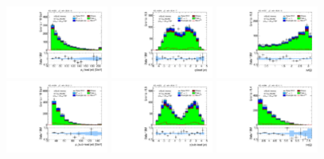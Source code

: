 \clearpage

\begin{figure}[!htpb]
  \includegraphics[width=0.30\textwidth]{figures/analysis/vbf-WlvCR/jet-1-pt}
  \includegraphics[width=0.30\textwidth]{figures/analysis/vbf-WlvCR/jet-1-eta}
  \includegraphics[width=0.30\textwidth]{figures/analysis/vbf-WlvCR/jets-dphi} \\
  \includegraphics[width=0.30\textwidth]{figures/analysis/vbf-WlvCR/jet-2-pt}
  \includegraphics[width=0.30\textwidth]{figures/analysis/vbf-WlvCR/jet-2-eta}
  \includegraphics[width=0.30\textwidth]{figures/analysis/vbf-WlvCR/jets-deta} \\

\end{figure}
